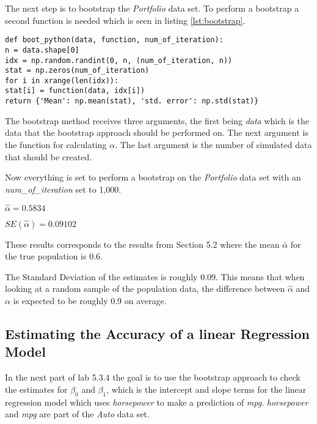 The next step is to bootstrap the \emph{Portfolio} data set.
To perform a bootstrap a second function is needed which is seen in listing \ref{lst:bootstrap}.

\begin{lstlisting}[caption={Bootstrap function in python}, label=lst:bootstrap, mathescape=true]
def boot_python(data, function, num_of_iteration):
n = data.shape[0]
idx = np.random.randint(0, n, (num_of_iteration, n))
stat = np.zeros(num_of_iteration)
for i in xrange(len(idx)):
stat[i] = function(data, idx[i])
return {'Mean': np.mean(stat), 'std. error': np.std(stat)}
\end{lstlisting}

The bootstrap method receives three arguments, the first being \emph{data} which is the data that the bootstrap approach should be performed on. The next argument is the function for calculating $\alpha$. The last argument is the number of simulated data that should be created.  

Now everything is set to perform a bootstrap on the \emph{Portfolio} data set with an \emph{num\_of\_iteration} set to 1,000.

\begin{center}
	$\hat{\alpha} = 0.5834$
\end{center}

\begin{center}
	$SE(\hat{\alpha}) = 0.09102$
\end{center}

These results corresponds to the results from Section 5.2\citep{ISLR} where the mean $\bar{\alpha}$ for the true population is 0.6. 

The Standard Deviation of the estimates is roughly 0.09. This means that when looking at a random sample of the population data, the difference between $\hat{\alpha}$ and $\alpha$ is expected to be roughly 0.9 on average.


\subsection{Estimating the Accuracy of a linear Regression Model}

In the next part of lab 5.3.4 the goal is to use the bootstrap approach to check the estimates for $\beta_0$ and $\beta_1$, which is the intercept and slope terms for the linear regression model which uses \emph{horsepower} to make a prediction of \emph{mpg}. \emph{horsepower} and \emph{mpg} are part of the \emph{Auto} data set.

